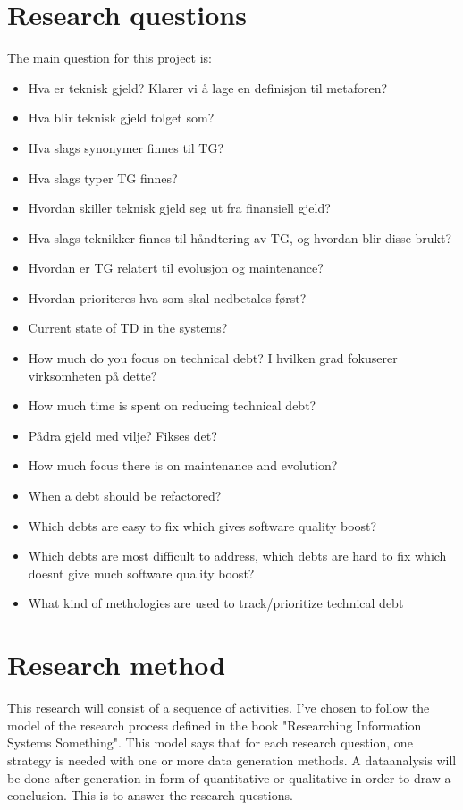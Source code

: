 \section{Research questions}
The main question for this project is: 
\begin{itemize}
	\item Hva er teknisk gjeld? Klarer vi å lage en definisjon til metaforen?
	\item Hva blir teknisk gjeld tolget som?
	\item Hva slags synonymer finnes til TG?
	\item Hva slags typer TG finnes? 
	\item Hvordan skiller teknisk gjeld seg ut fra finansiell gjeld?

	\item Hva slags teknikker finnes til håndtering av TG, og hvordan blir disse brukt?
	\item Hvordan er TG relatert til evolusjon og maintenance?

	\item Hvordan prioriteres hva som skal nedbetales først?




	\item Current state of TD in the systems?
	\item How much do you focus on technical debt? I hvilken grad fokuserer virksomheten på dette?
	\item How much time is spent on reducing technical debt?
	\item Pådra gjeld med vilje? Fikses det?
	\item How much focus there is on maintenance and evolution?
	\item When a debt should be refactored?
	\item Which debts are easy to fix which gives software quality boost?
	\item Which debts are most difficult to address, which debts are hard to fix which doesnt give much software quality boost?
	\item What kind of methologies are used to track/prioritize technical debt
\end{itemize}


\section{Research method}
This research will consist of a sequence of activities. I've chosen to follow the model of the research process defined in the book "Researching Information Systems Something". This model says that for each research question, one strategy is needed with one or more data generation methods. A dataanalysis will be done after generation in form of quantitative or qualitative in order to draw a conclusion. This is to answer the research questions.

